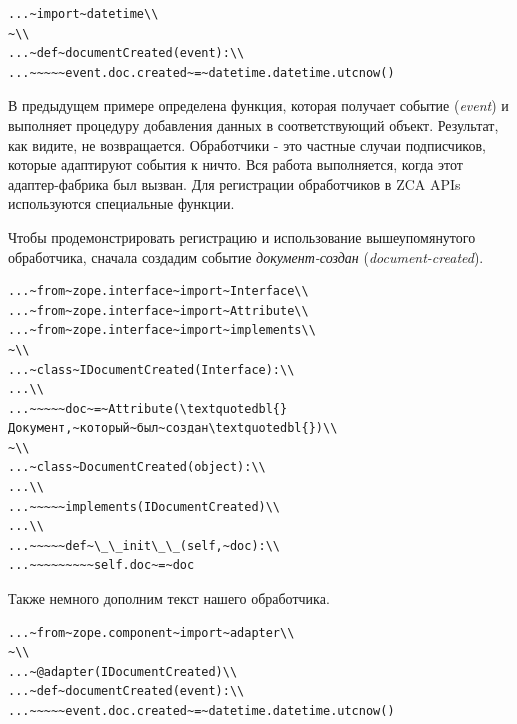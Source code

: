 \documentclass[a4paper,openany,twoside,draft]{book}
\providecommand*{\DUroletitlereference}[1]{\textsl{#1}}
\begin{document}
\begin{verbatim}
...~import~datetime\\
~\\
...~def~documentCreated(event):\\
...~~~~~event.doc.created~=~datetime.datetime.utcnow()
\end{verbatim}

В предыдущем примере определена функция, которая получает событие
(\DUroletitlereference{event}) и выполняет процедуру добавления данных в соответствующий
объект.  Результат, как видите, не возвращается.  Обработчики - это
частные случаи подписчиков, которые адаптируют события к \textquotedbl{}ничто\textquotedbl{}.  Вся
работа выполняется, когда этот адаптер-\textquotedbl{}фабрика\textquotedbl{} был вызван.  Для
регистрации обработчиков в ZCA APIs используются специальные функции.

Чтобы продемонстрировать регистрацию и использование вышеупомянутого
обработчика, сначала создадим событие \DUroletitlereference{документ-создан}
(\DUroletitlereference{document-created}).

\begin{verbatim}
...~from~zope.interface~import~Interface\\
...~from~zope.interface~import~Attribute\\
...~from~zope.interface~import~implements\\
~\\
...~class~IDocumentCreated(Interface):\\
...\\
...~~~~~doc~=~Attribute(\textquotedbl{}Документ,~который~был~создан\textquotedbl{})\\
~\\
...~class~DocumentCreated(object):\\
...\\
...~~~~~implements(IDocumentCreated)\\
...\\
...~~~~~def~\_\_init\_\_(self,~doc):\\
...~~~~~~~~~self.doc~=~doc
\end{verbatim}

Также немного дополним текст нашего обработчика.

\begin{verbatim}
...~from~zope.component~import~adapter\\
~\\
...~@adapter(IDocumentCreated)\\
...~def~documentCreated(event):\\
...~~~~~event.doc.created~=~datetime.datetime.utcnow()
\end{verbatim}
\end{document}
